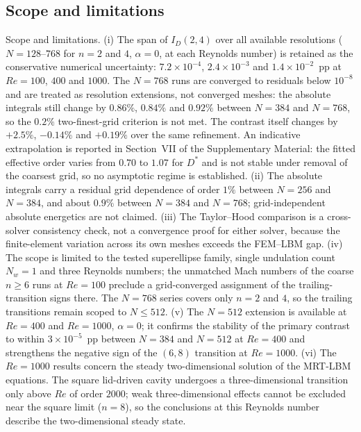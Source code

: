 \subsection{Scope and limitations}
\label{subsec:scope}

Scope and limitations. (i) The span of $I_D(2,4)$ over all available resolutions ($N=128$--$768$ for $n=2$ and $4$, $\alpha=0$, at each Reynolds number) is retained as the conservative numerical uncertainty: $7.2\times10^{-4}$, $2.4\times10^{-3}$ and $1.4\times10^{-2}$~pp at $Re=100$, $400$ and $1000$. The $N=768$ runs are converged to residuals below $10^{-8}$ and are treated as resolution extensions, not converged meshes: the absolute integrals still change by $0.86\%$, $0.84\%$ and $0.92\%$ between $N=384$ and $N=768$, so the $0.2\%$ two-finest-grid criterion is not met. The contrast itself changes by $+2.5\%$, $-0.14\%$ and $+0.19\%$ over the same refinement. An indicative extrapolation is reported in Section~VII of the Supplementary Material: the fitted effective order varies from $0.70$ to $1.07$ for $D^*$ and is not stable under removal of the coarsest grid, so no asymptotic regime is established. (ii) The absolute integrals carry a residual grid dependence of order $1\%$ between $N=256$ and $N=384$, and about $0.9\%$ between $N=384$ and $N=768$; grid-independent absolute energetics are not claimed. (iii) The Taylor--Hood comparison is a cross-solver consistency check, not a convergence proof for either solver, because the finite-element variation across its own meshes exceeds the FEM--LBM gap. (iv) The scope is limited to the tested superellipse family, single undulation count $N_w=1$ and three Reynolds numbers; the unmatched Mach numbers of the coarse $n\ge6$ runs at $Re=100$ preclude a grid-converged assignment of the trailing-transition signs there. The $N=768$ series covers only $n=2$ and $4$, so the trailing transitions remain scoped to $N\le512$. (v) The $N=512$ extension is available at $Re=400$ and $Re=1000$, $\alpha=0$; it confirms the stability of the primary contrast to within $3\times10^{-5}$~pp between $N=384$ and $N=512$ at $Re=400$ and strengthens the negative sign of the $(6,8)$ transition at $Re=1000$. (vi) The $Re=1000$ results concern the steady two-dimensional solution of the MRT-LBM equations. The square lid-driven cavity undergoes a three-dimensional transition only above $Re$ of order $2000$; weak three-dimensional effects cannot be excluded near the square limit ($n=8$), so the conclusions at this Reynolds number describe the two-dimensional steady state.

